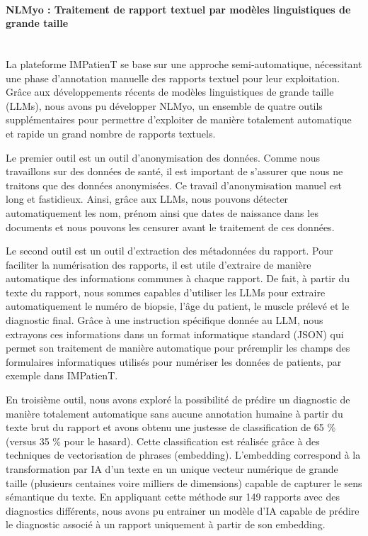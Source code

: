 \paragraph{\textbf{NLMyo : Traitement de rapport textuel par modèles linguistiques de grande taille}}\mbox{}\\

La plateforme IMPatienT se base sur une approche semi-automatique, nécessitant une phase d’annotation manuelle des rapports textuel pour leur exploitation. Grâce aux développements récents de modèles linguistiques de grande taille (LLMs), nous avons pu développer NLMyo, un ensemble de quatre outils supplémentaires pour permettre d’exploiter de manière totalement automatique et rapide un grand nombre de rapports textuels.

Le premier outil est un outil d’anonymisation des données. Comme nous travaillons sur des données de santé, il est important de s’assurer que nous ne traitons que des données anonymisées. Ce travail d’anonymisation manuel est long et fastidieux. Ainsi, grâce aux LLMs, nous pouvons détecter automatiquement les nom, prénom ainsi que dates de naissance dans les documents et nous pouvons les censurer avant le traitement de ces données.

Le second outil est un outil d’extraction des métadonnées du rapport. Pour faciliter la numérisation des rapports, il est utile d’extraire de manière automatique des informations communes à chaque rapport. De fait, à partir du texte du rapport, nous sommes capables d’utiliser les LLMs pour extraire automatiquement le numéro de biopsie, l’âge du patient, le muscle prélevé et le diagnostic final. Grâce à une instruction spécifique donnée au LLM, nous extrayons ces informations dans un format informatique standard (JSON) qui permet son traitement de manière automatique pour préremplir les champs des formulaires informatiques utilisés pour numériser les données de patients, par exemple dans IMPatienT.

En troisième outil, nous avons exploré la possibilité de prédire un diagnostic de manière totalement automatique sans aucune annotation humaine à partir du texte brut du rapport et avons obtenu une justesse de classification de 65 \% (versus 35 \% pour le hasard). Cette classification est réalisée grâce à des techniques de vectorisation de phrases (embedding). L’embedding correspond à la transformation par IA d’un texte en un unique vecteur numérique de grande taille (plusieurs centaines voire milliers de dimensions) capable de capturer le sens sémantique du texte. En appliquant cette méthode sur 149 rapports avec des diagnostics différents, nous avons pu entrainer un modèle d’IA capable de prédire le diagnostic associé à un rapport uniquement à partir de son embedding.

